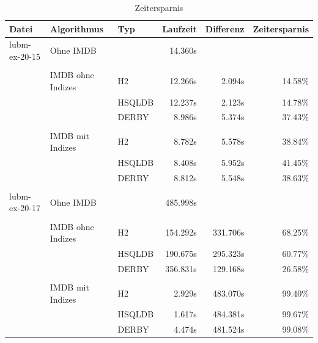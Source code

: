 \documentclass[draft,final]{vutinfth} %
\begin{document}
\begin{table}[]
\caption{Zeitersparnis}
\label{zeit}
\begin{tabular}{@{}lllrrr@{}}
\toprule
Datei         & Algorithmus       & Typ    & Laufzeit & Differenz & Zeitersparnis \\ \midrule
lubm-ex-20-15 & Ohne IMDB         &        & 14.360s  &           &               \\
              &                   &        &          &           &               \\
              & IMDB ohne Indizes & H2     & 12.266s  & 2.094s    & 14.58\%       \\
              &                   & HSQLDB & 12.237s  & 2.123s    & 14.78\%       \\
              &                   & DERBY  & 8.986s   & 5.374s    & 37.43\%       \\
              &                   &        &          &           &               \\
              & IMDB mit Indizes  & H2     & 8.782s   & 5.578s    & 38.84\%       \\
              &                   & HSQLDB & 8.408s   & 5.952s    & 41.45\%       \\
              &                   & DERBY  & 8.812s   & 5.548s    & 38.63\%       \\
              &                   &        &          &           &               \\
lubm-ex-20-17 & Ohne IMDB         &        & 485.998s &           &               \\
              &                   &        &          &           &               \\
              & IMDB ohne Indizes & H2     & 154.292s & 331.706s  & 68.25\%       \\
              &                   & HSQLDB & 190.675s & 295.323s  & 60.77\%       \\
              &                   & DERBY  & 356.831s & 129.168s  & 26.58\%       \\
              &                   &        &          &           &               \\
              & IMDB mit Indizes  & H2     & 2.929s   & 483.070s  & 99.40\%       \\
              &                   & HSQLDB & 1.617s   & 484.381s  & 99.67\%       \\
              &                   & DERBY  & 4.474s   & 481.524s  & 99.08\%       \\ \bottomrule
\end{tabular}
\end{table}
\end{document}

